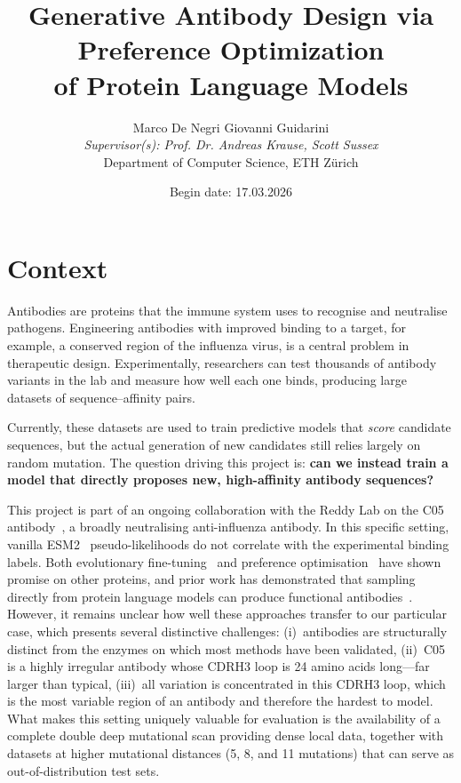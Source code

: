 \documentclass[11pt, a4paper]{article}
\title{\vspace{-1.5cm}\textbf{Generative Antibody Design via Preference Optimization\\of Protein Language Models}\vspace{-0.3cm}}
\author{
    Marco De Negri \quad Giovanni Guidarini\\[0.3em]
    \textit{Supervisor(s): Prof. Dr. Andreas Krause, Scott Sussex}\\[0.2em]
    \small Department of Computer Science, ETH Z\"urich
}
\date{Begin date:  17.03.2026}
\begin{document}
\maketitle
 
\section*{Context}
 
Antibodies are proteins that the immune system uses to recognise and neutralise pathogens. Engineering antibodies with improved binding to a target, for example, a conserved region of the influenza virus, is a central problem in therapeutic design. Experimentally, researchers can test thousands of antibody variants in the lab and measure how well each one binds, producing large datasets of sequence--affinity pairs.
 
Currently, these datasets are used to train predictive models that \emph{score} candidate sequences, but the actual generation of new candidates still relies largely on random mutation. The question driving this project is: \textbf{can we instead train a model that directly proposes new, high-affinity antibody sequences?}
 
This project is part of an ongoing collaboration with the Reddy Lab on the C05 antibody~\cite{ekiert2012cross}, a broadly neutralising anti-influenza antibody. In this specific setting, vanilla ESM2~\cite{lin2023evolutionary} pseudo-likelihoods do not correlate with the experimental binding labels. Both evolutionary fine-tuning~\cite{alley2019unified} and preference optimisation~\cite{ferragu2025gdpo} have shown promise on other proteins, and prior work has demonstrated that sampling directly from protein language models can produce functional antibodies~\cite{hie2023efficient, shanehsazzadeh2023unlocking}. However, it remains unclear how well these approaches transfer to our particular case, which presents several distinctive challenges: (i)~antibodies are structurally distinct from the enzymes on which most methods have been validated, (ii)~C05 is a highly irregular antibody whose CDRH3 loop is 24 amino acids long---far larger than typical, (iii)~all variation is concentrated in this CDRH3 loop, which is the most variable region of an antibody and therefore the hardest to model. What makes this setting uniquely valuable for evaluation is the availability of a complete double deep mutational scan providing dense local data, together with datasets at higher mutational distances (5, 8, and 11 mutations) that can serve as out-of-distribution test sets.
 
\end{document}

